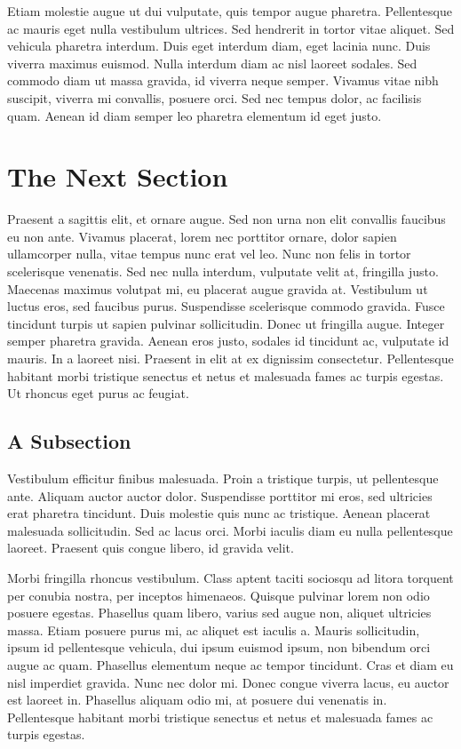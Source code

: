 \documentclass[11pt,]{article}
\begin{document}
Etiam molestie augue ut dui vulputate, quis tempor augue pharetra.
Pellentesque ac mauris eget nulla vestibulum ultrices. Sed hendrerit in
tortor vitae aliquet. Sed vehicula pharetra interdum. Duis eget interdum
diam, eget lacinia nunc. Duis viverra maximus euismod. Nulla interdum
diam ac nisl laoreet sodales. Sed commodo diam ut massa gravida, id
viverra neque semper. Vivamus vitae nibh suscipit, viverra mi convallis,
posuere orci. Sed nec tempus dolor, ac facilisis quam. Aenean id diam
semper leo pharetra elementum id eget justo.

\hypertarget{the-next-section}{%
\section{The Next Section}\label{the-next-section}}

Praesent a sagittis elit, et ornare augue. Sed non urna non elit
convallis faucibus eu non ante. Vivamus placerat, lorem nec porttitor
ornare, dolor sapien ullamcorper nulla, vitae tempus nunc erat vel leo.
Nunc non felis in tortor scelerisque venenatis. Sed nec nulla interdum,
vulputate velit at, fringilla justo. Maecenas maximus volutpat mi, eu
placerat augue gravida at. Vestibulum ut luctus eros, sed faucibus
purus. Suspendisse scelerisque commodo gravida. Fusce tincidunt turpis
ut sapien pulvinar sollicitudin. Donec ut fringilla augue. Integer
semper pharetra gravida. Aenean eros justo, sodales id tincidunt ac,
vulputate id mauris. In a laoreet nisi. Praesent in elit at ex dignissim
consectetur. Pellentesque habitant morbi tristique senectus et netus et
malesuada fames ac turpis egestas. Ut rhoncus eget purus ac feugiat.

\hypertarget{a-subsection}{%
\subsection{A Subsection}\label{a-subsection}}

Vestibulum efficitur finibus malesuada. Proin a tristique turpis, ut
pellentesque ante. Aliquam auctor auctor dolor. Suspendisse porttitor mi
eros, sed ultricies erat pharetra tincidunt. Duis molestie quis nunc ac
tristique. Aenean placerat malesuada sollicitudin. Sed ac lacus orci.
Morbi iaculis diam eu nulla pellentesque laoreet. Praesent quis congue
libero, id gravida velit.

Morbi fringilla rhoncus vestibulum. Class aptent taciti sociosqu ad
litora torquent per conubia nostra, per inceptos himenaeos. Quisque
pulvinar lorem non odio posuere egestas. Phasellus quam libero, varius
sed augue non, aliquet ultricies massa. Etiam posuere purus mi, ac
aliquet est iaculis a. Mauris sollicitudin, ipsum id pellentesque
vehicula, dui ipsum euismod ipsum, non bibendum orci augue ac quam.
Phasellus elementum neque ac tempor tincidunt. Cras et diam eu nisl
imperdiet gravida. Nunc nec dolor mi. Donec congue viverra lacus, eu
auctor est laoreet in. Phasellus aliquam odio mi, at posuere dui
venenatis in. Pellentesque habitant morbi tristique senectus et netus et
malesuada fames ac turpis egestas.
\end{document}

